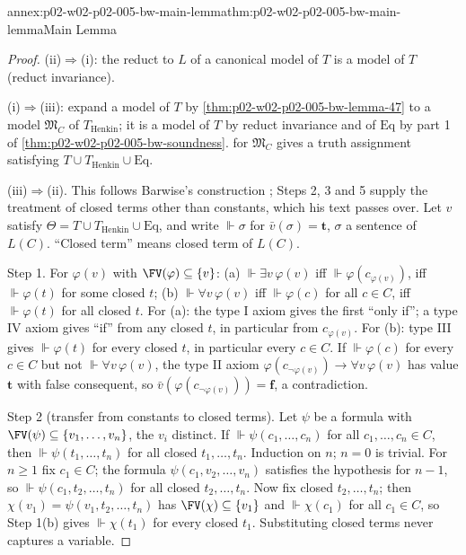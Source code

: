 \begin{annexitem}{annex:p02-w02-p02-005-bw-main-lemma}{thm:p02-w02-p02-005-bw-main-lemma}{Main Lemma}
\begin{proof}
(ii)\(\Rightarrow\)(i): the reduct to \(L\) of a canonical model of \(T\) is
a model of \(T\) (reduct invariance).

(i)\(\Rightarrow\)(iii): expand a model of \(T\) by
\cref{thm:p02-w02-p02-005-bw-lemma-47} to a model \(\mathfrak M_C\) of
\(T_{\mathrm{Henkin}}\); it is a model of \(T\) by reduct invariance and of
\(\mathrm{Eq}\) by part 1 of \cref{thm:p02-w02-p02-005-bw-soundness}.
 for \(\mathfrak M_C\) gives a truth
assignment satisfying \(T\cup T_{\mathrm{Henkin}}\cup\mathrm{Eq}\).

(iii)\(\Rightarrow\)(ii).  This follows Barwise's construction
\cite[ch.~A.1, \S4, pp.~31--33]{Barwise1977FirstOrder}; Steps 2, 3 and 5
supply the treatment of closed terms other than constants, which his text
passes over.  Let \(v\) satisfy
\(\Theta=T\cup T_{\mathrm{Henkin}}\cup\mathrm{Eq}\), and write
\(\Vdash\sigma\) for \(\bar v(\sigma)=\mathbf t\), \(\sigma\) a sentence of
\(L(C)\).  ``Closed term'' means closed term of \(L(C)\).

Step 1.  For \(\varphi(v)\) with \(\FV(\varphi)\subseteq\{v\}\):
(a) \(\Vdash\exists v\,\varphi(v)\) iff \(\Vdash\varphi(c_{\varphi(v)})\),
iff \(\Vdash\varphi(t)\) for some closed \(t\); (b)
\(\Vdash\forall v\,\varphi(v)\) iff \(\Vdash\varphi(c)\) for all \(c\in C\),
iff \(\Vdash\varphi(t)\) for all closed \(t\).  For (a): the type I axiom
gives the first ``only if''; a type IV axiom gives ``if'' from any closed
\(t\), in particular from \(c_{\varphi(v)}\).  For (b): type III gives
\(\Vdash\varphi(t)\) for every closed \(t\), in particular every
\(c\in C\).  If \(\Vdash\varphi(c)\) for every \(c\in C\) but not
\(\Vdash\forall v\,\varphi(v)\), the type II axiom
\(\varphi(c_{\neg\varphi(v)})\to\forall v\,\varphi(v)\) has value
\(\mathbf t\) with false consequent, so
\(\bar v(\varphi(c_{\neg\varphi(v)}))=\mathbf f\), a contradiction.

Step 2 (transfer from constants to closed terms).  Let \(\psi\) be a
formula with \(\FV(\psi)\subseteq\{v_1,\ldots,v_n\}\), the \(v_i\)
distinct.  If \(\Vdash\psi(c_1,\ldots,c_n)\) for all
\(c_1,\ldots,c_n\in C\), then \(\Vdash\psi(t_1,\ldots,t_n)\) for all closed
\(t_1,\ldots,t_n\).  Induction on \(n\); \(n=0\) is trivial.  For
\(n\geq1\) fix \(c_1\in C\); the formula \(\psi(c_1,v_2,\ldots,v_n)\)
satisfies the hypothesis for \(n-1\), so
\(\Vdash\psi(c_1,t_2,\ldots,t_n)\) for all closed \(t_2,\ldots,t_n\).  Now
fix closed \(t_2,\ldots,t_n\); then \(\chi(v_1)=\psi(v_1,t_2,\ldots,t_n)\)
has \(\FV(\chi)\subseteq\{v_1\}\) and \(\Vdash\chi(c_1)\) for all
\(c_1\in C\), so Step 1(b) gives \(\Vdash\chi(t_1)\) for every closed
\(t_1\).  Substituting closed terms never captures a variable.


\end{proof}
\end{annexitem}
